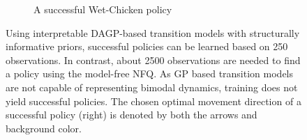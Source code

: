 \begin{figure}[tp]
\begin{subfigure}[b]{\linewidth}
        \caption{
            \label{fig:interpretable_reinforcement_learning:wetchicken:policy}
            A successful Wet-Chicken policy
        }
    \end{subfigure}
    \caption{
        \label{fig:interpretable_reinforcement_learning:wetchicken_policy}
        Using interpretable DAGP-based transition models with structurally informative priors, successful policies can be learned based on 250 observations.
        In contrast, about 2500 observations are needed to find a policy using the model-free NFQ.
        As GP based transition models are not capable of representing bimodal dynamics, training does not yield successful policies.
        The chosen optimal movement direction of a successful policy (right) is denoted by both the arrows and background color.
    }
\end{figure}
